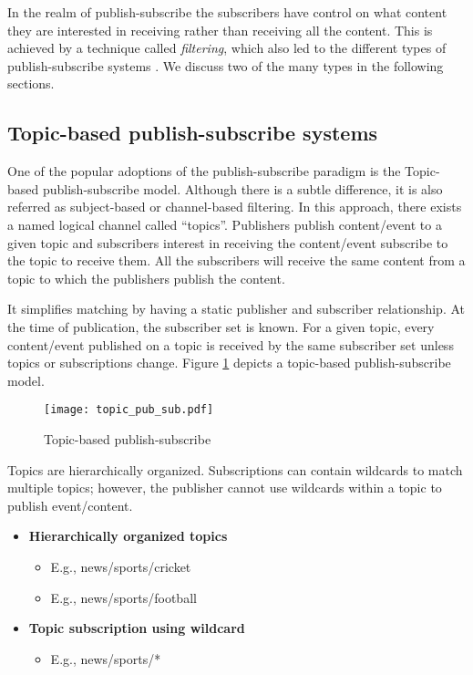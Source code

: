 In the realm of publish-subscribe the subscribers have control on what content they are interested in receiving rather than receiving all the content. This is achieved by a technique called \textit {filtering}, which also led to the different types of publish-subscribe systems \parencite{Eugster:2003:MFP:857076.857078}. We discuss two of the many types in the following sections.

\subsection{Topic-based publish-subscribe systems}

One of the popular adoptions of the publish-subscribe paradigm is the Topic-based publish-subscribe model. Although there is a subtle difference, it is also referred as subject-based or channel-based filtering. In this approach, there exists a named logical channel called \enquote{topics}. Publishers publish content/event to a given topic and subscribers interest in receiving the content/event subscribe to the topic to receive them. All the subscribers will receive the same content from a topic to which the publishers publish the content. 

It simplifies matching by having a static publisher and subscriber relationship. At the time of publication, the subscriber set is known. For a given topic, every content/event published on a topic is received by the same subscriber set unless topics or subscriptions change. Figure \ref{figures:topic_pub_sub} depicts a topic-based publish-subscribe model.

    \makeatletter
    \setlength{\intextsep}{20pt}
    \makeatother

    \begin{figure}[h!]
    \centering
    \texttt{[image: topic\_pub\_sub.pdf]}
    \caption{Topic-based publish-subscribe}\label{figures:topic_pub_sub}
    \end{figure}

Topics are hierarchically organized. Subscriptions can contain wildcards to match multiple topics; however, the publisher cannot use wildcards within a topic to publish event/content.

\begin{itemize}
\item[]\textbf{Hierarchically organized topics}
    \begin{itemize}
    \item E.g., news/sports/cricket
    \item E.g., news/sports/football
    \end{itemize}

\item[]\textbf{Topic subscription using wildcard}
    \begin{itemize}
    \item E.g., news/sports/*
    \end{itemize}
\end{itemize}



